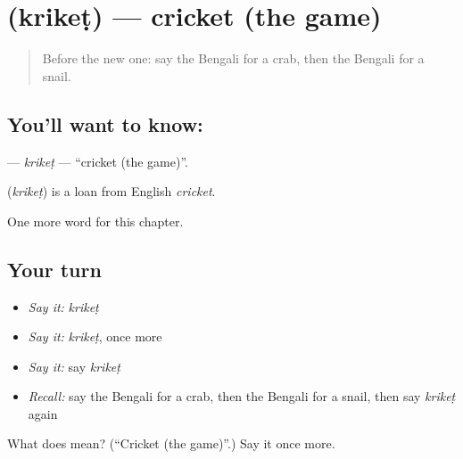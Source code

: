 \section[\texorpdfstring{\bn{ক্রিকেট} (krikeṭ)}{ক্রিকেট (krikeṭ)}]{ (krikeṭ) — cricket (the game)}

\label{lesson:BN-C166-kriket}



\begin{quote}
Before the new one: say the Bengali for a crab, then the Bengali for a snail.
\end{quote}

\subsection*{You'll want to know: }
\textbf{} — \emph{krikeṭ} — \textquotedblleft{}cricket (the game)\textquotedblright{}.

\begin{cousinweb}
\textbf{} (\emph{krikeṭ}) is a loan from English \emph{cricket}.
\end{cousinweb}

\begin{grammarlens}[title={What you've built}]
One more word for this chapter.
\end{grammarlens}

\subsection*{Your turn}
\begin{itemize}
\raggedright
  \item \emph{Say it:} \emph{krikeṭ}
  \item \emph{Say it:} \emph{krikeṭ}, once more
  \item \emph{Say it:} say \emph{krikeṭ}
  \item \emph{Recall:} say the Bengali for a crab, then the Bengali for a snail, then say \emph{krikeṭ} again
\end{itemize}

\begin{tcolorbox}[breakable,colback=teal!4,colframe=teal!35!black,title={Before you move on}]
What does  mean? (\textquotedblleft{}Cricket (the game)\textquotedblright{}.) Say it once more.
\end{tcolorbox}
